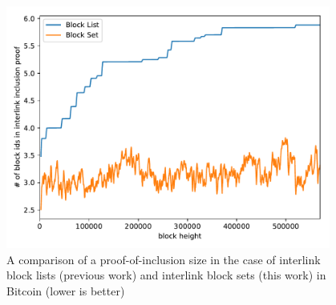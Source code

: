 \begin{figure}[h]
\begin{center}
  \includegraphics[width=0.95\textwidth]{figures/interlink-proof-list-vs-set.pdf}
  \caption{A comparison of a proof-of-inclusion size in the case of interlink block lists (previous work) and interlink block sets (this work) in Bitcoin (lower is better)}
  \label{fig.set-list-proof-comparison}
  \end{center}
\end{figure}

